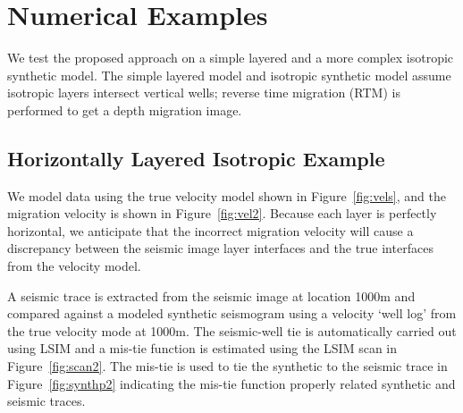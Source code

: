 
\section{Numerical Examples}
We test the proposed approach on a simple layered and a more complex isotropic synthetic model. The simple layered model and isotropic synthetic model assume isotropic layers intersect vertical wells; reverse time migration (RTM) is performed to get a depth migration image.

\subsection{Horizontally Layered Isotropic Example}

We model data using the true velocity model shown in Figure~\ref{fig:vels}, and the migration velocity is shown in Figure~\ref{fig:vel2}. Because each layer is perfectly horizontal, we anticipate that the incorrect migration velocity will cause a discrepancy between the seismic image layer interfaces and the true interfaces from the velocity model.


A seismic trace is extracted from the seismic image at location 1000m and compared against a modeled synthetic seismogram using a velocity `well log' from the true velocity mode at 1000m. The seismic-well tie is automatically carried out using LSIM and a mis-tie function is estimated using the LSIM scan in Figure~\ref{fig:scan2}. The mis-tie is used to tie the synthetic to the seismic trace in Figure~\ref{fig:synthp2} indicating the mis-tie function properly related synthetic and seismic traces.



